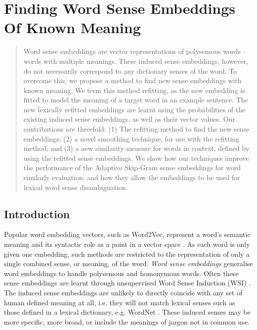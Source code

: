 %
%
%
%
%
{

\newlength\xunit
\xunit=1cm


\newcommand{\W}{\mathcal{W}}
\renewcommand{\c}{\mathbf{c}}
\newcommand{\s}{\mathbf{s}}
\renewcommand{\l}{\mathbf{l}}
\renewcommand{\u}{\mathbf{u}}
\newcommand{\ci}{\perp\!\!\!\perp} %


\newcommand{\wordquote}[1]{\enquote{\texttt{#1}}}

	

\chapter{Finding Word Sense Embeddings Of Known Meaning}


\begin{abstract}
Word sense embeddings are vector representations of polysemous words -- words with multiple meanings.
These induced sense embeddings, however, do not necessarily correspond to any dictionary senses of the word.
To overcome this, we propose a method to find new sense embeddings with known meaning.
We term this method refitting, as the new embedding is fitted to model the meaning of a target word in an example sentence.
The new lexically refitted embeddings are learnt using the probabilities of the existing induced sense embeddings, as well as their vector values.
Our contributions are threefold:
(1) The refitting method to find the new sense embeddings;
 (2) a novel smoothing technique, for use with the refitting method;
and (3) a new similarity measure for words in context, defined by using the refitted sense embeddings.
We show how our techniques improve the performance of the Adaptive Skip-Gram sense embeddings for word similarly evaluation; and how they allow the embeddings to be used for lexical word sense disambiguation.
\end{abstract}


\section{Introduction}

Popular word embedding vectors, such as Word2Vec, represent a word's semantic meaning and its syntactic role as a point in a vector space \parencite{mikolov2013efficient,pennington2014glove}.
As each word is only given one embedding, such methods are restricted to the representation of only a single combined sense, or meaning, of the word.
\emph{Word sense embeddings} generalise word embeddings to handle polysemous and homonymous  words.
Often these sense embeddings are learnt through unsupervised Word Sense Induction (WSI) \parencite{Reisinger2010,Huang2012,tian2014probabilistic,AdaGrams}.
The induced sense embeddings are unlikely to directly coincide with any set of human defined meaning at all, i.e. they will not match lexical senses such as those defined in a lexical dictionary, e.g. WordNet \parencite{miller1995wordnet}.
These induced senses may be more specific, more broad, or include the meanings of jargon not in common use.


}
